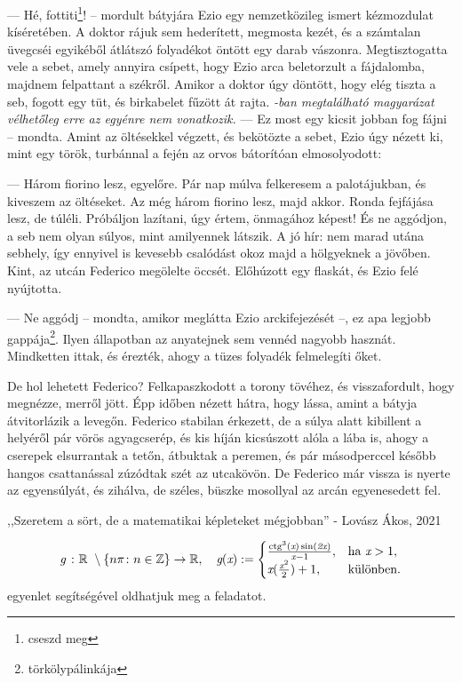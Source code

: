 \documentclass[12pt, a4paper, twoside]{report}
\DeclareMathOperator{\ctg}{ctg}
\theoremstyle{definition}
\theoremstyle{remark}
\begin{document}
— Hé,  fottiti\footnote{cseszd meg}!  -- mordult  bátyjára  Ezio  egy  nemzetközileg  ismert 
kézmozdulat kíséretében. 
A doktor rájuk sem  hederített, megmosta kezét, és a  számtalan 
üvegcséi  egyikéből  átlátszó  folyadékot öntött  egy  darab  vászonra. 
Megtisztogatta vele a sebet, amely annyira csípett, hogy Ezio arca 
beletorzult  a  fájdalomba,  majdnem  felpattant  a székről.  Amikor  a 
doktor  úgy  döntött,  hogy  elég  tiszta  a  seb,  fogott  egy  tüt,  és 
birkabelet fűzött át rajta. \emph{\Az{\ref{definicio}}-ban megtalálható magyarázat vélhetőleg erre az egyénre nem vonatkozik.}
— Ez  most  egy  kicsit  jobban  fog  fájni  --  mondta.  Amint  az 
öltésekkel végzett, és bekötözte a sebet, Ezio úgy nézett ki, mint egy 
török, turbánnal a fején az orvos bátorítóan elmosolyodott: 

— Három  fiorino  lesz,  egyelőre.  Pár  nap  múlva  felkeresem  a 
palotájukban, és kiveszem az öltéseket. Az még három fiorino lesz, 
majd akkor. Ronda fejfájása lesz, de túléli. Próbáljon lazítani, úgy 
értem, önmagához képest! És ne aggódjon, a seb nem olyan súlyos, 
mint amilyennek  látszik.  A  jó  hír:  nem  marad  utána sebhely,  így 
ennyivel is kevesebb csalódást okoz majd a hölgyeknek a jövőben. 
Kint, az utcán Federico megölelte öccsét. Előhúzott egy flaskát, és 
Ezio felé nyújtotta. 

— Ne aggódj -- mondta, amikor meglátta Ezio arckifejezését --, ez 
apa  legjobb  gappája\footnote{törkölypálinkája}.  Ilyen  állapotban  az  anyatejnek  sem  vennéd 
nagyobb hasznát. 
Mindketten ittak, és érezték, ahogy a tüzes folyadék felmelegíti 
őket.\cite{BERNE}

De  hol  lehetett  Federico?  Felkapaszkodott  a torony  tövéhez,  és 
visszafordult, hogy megnézze, merről jött. Épp időben nézett hátra, 
hogy lássa, amint a bátyja átvitorlázik a levegőn. Federico stabilan 
érkezett, de a súlya alatt kibillent a helyéről pár vörös agyagcserép, 
és kis híján kicsúszott alóla a lába is, ahogy a cserepek elsurrantak a 
tetőn,  átbuktak  a  peremen,  és  pár  másodperccel  később  hangos 
csattanással zúzódtak szét az utcakövön. De Federico már vissza is 
nyerte  az  egyensúlyát,  és  zihálva,  de  széles,  büszke  mosollyal  az 
arcán egyenesedett fel.

,,Szeretem a sört, de a matematikai képleteket mégjobban'' - Lovász Ákos, 2021
\smallskip

\begin{equation} \label{keplet}
    \emph{g}\ \colon\mathbb{R}\ \setminus
    \left\{n\pi \colon n \in\mathbb{Z}\right\}\to\mathbb{R},\quad
    \emph{g}(\emph{x}):=
    \begin{cases}
        \frac{\ctg^3(\emph{x})\sin(\emph{2x})}{\emph{x}-1},&\text{ha }\emph{x} > 1,\\
        \emph{x}(\frac{\emph{x}^2}2)+1,&\text{különben}.
    \end{cases}
    \end{equation}\cite[A képlet forrása]{TomacsTibor}
    \Az{\eqref{keplet}} egyenlet segítségével oldhatjuk meg a feladatot.
\end{document}
